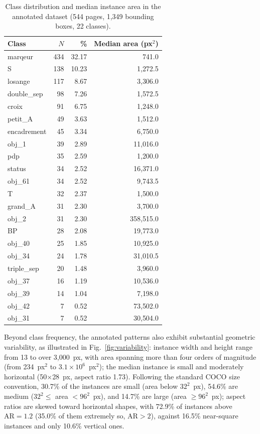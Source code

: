 \documentclass{iopjournal}
\begin{document}
\begin{table}[htb]
\centering
\caption{Class distribution and median instance area in the annotated dataset (544 pages, 1{,}349 bounding boxes, 22 classes).}
\label{tab:class_distribution}
\begin{tabular}{lrrr}
\toprule
Class & $N$ & \% & Median area (px$^2$) \\
\midrule
marqeur      & 434 & 32.17 & 741.0 \\
S            & 138 & 10.23 & 1{,}272.5 \\
losange      & 117 & 8.67  & 3{,}306.0 \\
double\_sep  & 98  & 7.26  & 1{,}572.5 \\
croix        & 91  & 6.75  & 1{,}248.0 \\
petit\_A     & 49  & 3.63  & 1{,}512.0 \\
encadrement  & 45  & 3.34  & 6{,}750.0 \\
obj\_1       & 39  & 2.89  & 11{,}016.0 \\
pdp          & 35  & 2.59  & 1{,}200.0 \\
status       & 34  & 2.52  & 16{,}371.0 \\
obj\_61      & 34  & 2.52  & 9{,}743.5 \\
T            & 32  & 2.37  & 1{,}500.0 \\
grand\_A     & 31  & 2.30  & 3{,}700.0 \\
obj\_2       & 31  & 2.30  & 358{,}515.0 \\
BP           & 28  & 2.08  & 19{,}773.0 \\
obj\_40      & 25  & 1.85  & 10{,}925.0 \\
obj\_34      & 24  & 1.78  & 31{,}010.5 \\
triple\_sep  & 20  & 1.48  & 3{,}960.0 \\
obj\_37      & 16  & 1.19  & 10{,}536.0 \\
obj\_39      & 14  & 1.04  & 7{,}198.0 \\
obj\_42      & 7   & 0.52  & 73{,}502.0 \\
obj\_31      & 7   & 0.52  & 30{,}504.0 \\
\bottomrule
\end{tabular}
\end{table}
 
Beyond class frequency, the annotated patterns also exhibit substantial geometric variability, as illustrated in Fig.~\ref{fig:variability}: instance width and height range from 13 to over 3{,}000~px, with area spanning more than four orders of magnitude (from 234~px$^2$ to $3.1\times10^{6}$~px$^2$); the median instance is small and moderately horizontal (50$\times$28~px, aspect ratio 1.73). Following the standard COCO size convention, 30.7\% of the instances are small (area below $32^2$~px), 54.6\% are medium ($32^2 \leq$ area $< 96^2$~px), and 14.7\% are large (area $\geq 96^2$~px); aspect ratios are skewed toward horizontal shapes, with 72.9\% of instances above $\mathrm{AR}=1.2$ (35.0\% of them extremely so, $\mathrm{AR}>2$), against 16.5\% near-square instances and only 10.6\% vertical ones.
 
\end{document}
